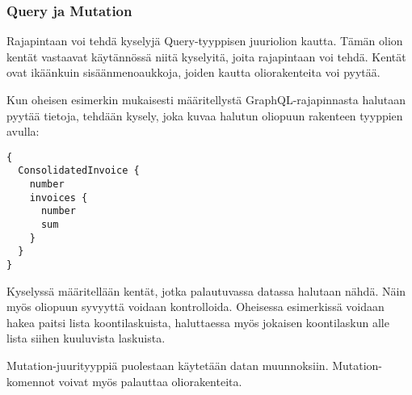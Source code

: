 \hypertarget{query-ja-mutation}{%
\subsubsection{Query ja Mutation}\label{query-ja-mutation}}

Rajapintaan voi tehdä kyselyjä Query-tyyppisen juuriolion kautta. Tämän
olion kentät vastaavat käytännössä niitä kyselyitä, joita rajapintaan
voi tehdä. Kentät ovat ikäänkuin sisäänmenoaukkoja, joiden kautta
oliorakenteita voi pyytää.

Kun oheisen esimerkin mukaisesti määritellystä GraphQL-rajapinnasta
halutaan pyytää tietoja, tehdään kysely, joka kuvaa halutun oliopuun
rakenteen tyyppien avulla:

\begin{verbatim}
{
  ConsolidatedInvoice {
    number
    invoices {
      number
      sum
    }
  }
}
\end{verbatim}

Kyselyssä määritellään kentät, jotka palautuvassa datassa halutaan
nähdä. Näin myös oliopuun syvyyttä voidaan kontrolloida. Oheisessa
esimerkissä voidaan hakea paitsi lista koontilaskuista, haluttaessa myös
jokaisen koontilaskun alle lista siihen kuuluvista laskuista.

Mutation-juurityyppiä puolestaan käytetään datan muunnoksiin.
Mutation-komennot voivat myös palauttaa oliorakenteita.
